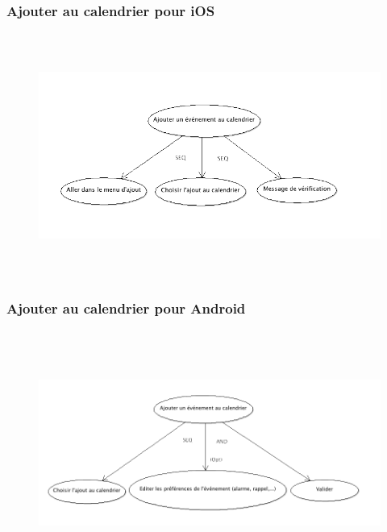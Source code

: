 \documentclass[a4paper, 11px]{article}
\begin{document}
\subsubsection{Ajouter au calendrier pour iOS}
\vfill
\begin{figure}[h!]
\includegraphics[width=18cm,height=8cm]{ajouter_evenement_calendrier_iOS.png}
\end{figure}

\subsubsection{Ajouter au calendrier pour Android}

\begin{figure}[h!]
\includegraphics[width=18cm,height=8cm]{ajouter_evenement_calendrier_Android.png}
\end{figure}
\vfill
\clearpage
\end{document}
